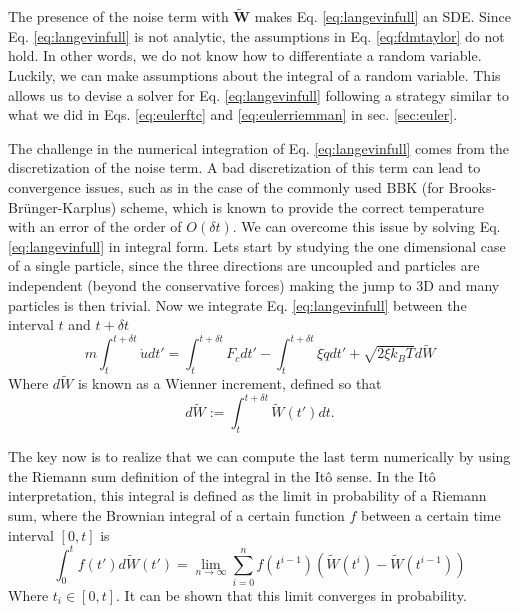 \documentclass[twoside,openright,titlepage,numbers=noenddot,%
headinclude,footinclude,cleardoublepage=empty,abstract=on,
BCOR=5mm,fontsize=11pt, dvipsnames, paper=b5
]{scrreprt}
\renewcommand{\vec}[1]{\bm{#1}}
\newcommand{\dt}{\delta t}
\newcommand{\kT}{k_B T}
\newcommand{\noise}{\widetilde{W}}
\newcommand{\ppos}{q}
\newcommand{\pvel}{u}
\begin{document}
The presence of the noise term with $\vec{\widetilde{W}}$ makes Eq. \eqref{eq:langevinfull} an \gls{SDE}. Since Eq. \eqref{eq:langevinfull} is not analytic, the assumptions in Eq. \eqref{eq:fdmtaylor} do not hold. In other words, we do not know how to differentiate a random variable. Luckily, we can make assumptions about the integral of a random variable. This allows us to devise a solver for Eq. \eqref{eq:langevinfull} following a strategy  similar to what we did in Eqs. \eqref{eq:eulerftc} and \eqref{eq:eulerriemman} in sec. \ref{sec:euler}.

The challenge in the numerical integration of Eq. \eqref{eq:langevinfull} comes from the discretization of the noise term.
A bad discretization of this term can lead to convergence issues, such as in the case of the commonly used BBK (for Brooks-Brünger-Karplus) scheme\cite{Brunger1984}, which is known to provide the correct temperature with an error of the order of $O(\dt)$\cite{Wang2003}.
We can overcome this issue by solving Eq. \eqref{eq:langevinfull} in integral form. Lets start by studying the one dimensional case of a single particle, since the three directions are uncoupled and particles are independent (beyond the conservative forces) making the jump to 3D and many particles is then trivial. Now we integrate Eq. \eqref{eq:langevinfull} between the interval $t$ and $t+\dt$
\begin{equation}
  \label{eq:langevinriemann}
  m\int_t^{t+\dt}\dot{\pvel} dt' = \int_t^{t+\dt}F_c dt' - \int_t^{t+\dt}\xi\dot{\ppos}dt' + \sqrt{2\xi\kT}d\noise
\end{equation}
Where $d\noise$ is known as a Wienner increment, defined so that
\begin{equation}
  \label{eq:langevinwiennerinc}
  d\noise := \int_t^{t+\dt}\noise(t') dt.
\end{equation}

The key now is to realize that we can compute the last term numerically by using the Riemann sum definition of the integral in the Itô sense.
In the Itô interpretation, this integral is defined as the limit in probability of a Riemann sum, where the Brownian integral of a certain function $f$ between a certain time interval $[0, t]$ is
\begin{equation}
  \label{eq:itonoise}
  \int_0^tf(t')d\noise(t') = \lim_{n\rightarrow\infty}\sum_{i=0}^nf(t^{i-1}) (\noise(t^i) - \noise({t^{i-1}}))
\end{equation}
Where $t_i\in [0, t]$.
It can be shown that this limit converges in probability\cite{Cohen2015}.
\end{document}
